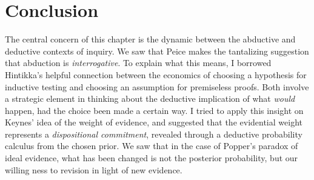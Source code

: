  
\section{Conclusion}\label{woeconclusion}

The central concern of this chapter is the dynamic between the abductive and deductive contexts of inquiry. We saw that Peice makes the tantalizing suggestion that abduction is \emph{interrogative}. To explain what this means, I borrowed Hintikka's helpful connection between the economics of choosing a hypothesis for inductive testing and choosing an assumption for premiseless proofs. Both involve a strategic element in thinking about the deductive implication of what \emph{would} happen, had the choice been made a certain way. I tried to apply this insight on Keynes' idea of the weight of evidence, and suggested that the evidential weight represents a \emph{dispositional commitment}, revealed through a deductive probability calculus from the chosen prior. We saw that in the case of Popper's paradox of ideal evidence, what has been changed is not the posterior probability, but our willing ness to revision in light of new evidence.  


